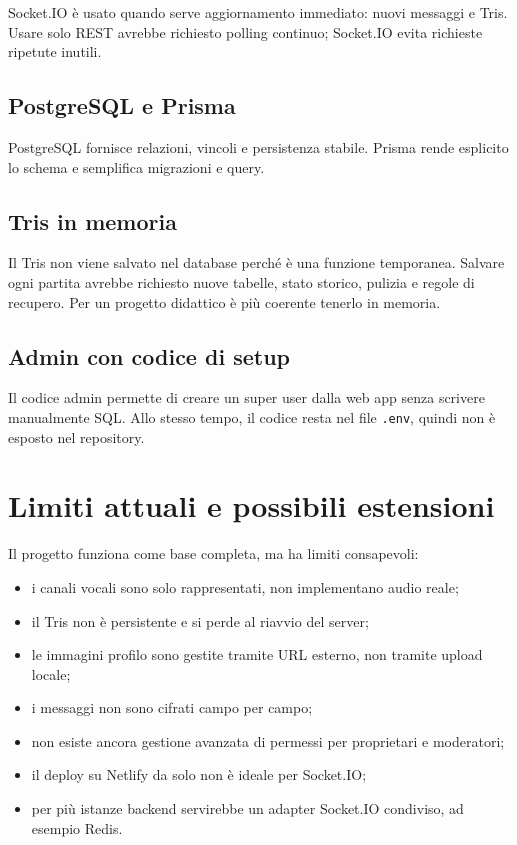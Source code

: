\documentclass[11pt,a4paper]{article}
\begin{document}
Socket.IO è usato quando serve aggiornamento immediato: nuovi messaggi e Tris. Usare solo REST avrebbe richiesto polling continuo; Socket.IO evita richieste ripetute inutili.

\subsection{PostgreSQL e Prisma}

PostgreSQL fornisce relazioni, vincoli e persistenza stabile. Prisma rende esplicito lo schema e semplifica migrazioni e query.

\subsection{Tris in memoria}

Il Tris non viene salvato nel database perché è una funzione temporanea. Salvare ogni partita avrebbe richiesto nuove tabelle, stato storico, pulizia e regole di recupero. Per un progetto didattico è più coerente tenerlo in memoria.

\subsection{Admin con codice di setup}

Il codice admin permette di creare un super user dalla web app senza scrivere manualmente SQL. Allo stesso tempo, il codice resta nel file \texttt{.env}, quindi non è esposto nel repository.

\section{Limiti attuali e possibili estensioni}

Il progetto funziona come base completa, ma ha limiti consapevoli:

\begin{itemize}
  \item i canali vocali sono solo rappresentati, non implementano audio reale;
  \item il Tris non è persistente e si perde al riavvio del server;
  \item le immagini profilo sono gestite tramite URL esterno, non tramite upload locale;
  \item i messaggi non sono cifrati campo per campo;
  \item non esiste ancora gestione avanzata di permessi per proprietari e moderatori;
  \item il deploy su Netlify da solo non è ideale per Socket.IO;
  \item per più istanze backend servirebbe un adapter Socket.IO condiviso, ad esempio Redis.
\end{itemize}
\end{document}
